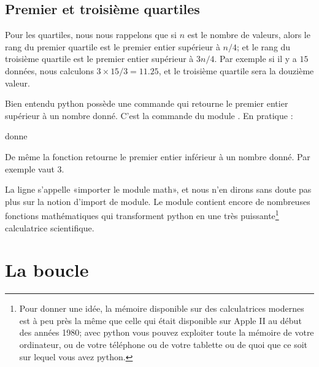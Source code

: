 \subsection{Premier et troisième quartiles}

Pour les quartiles, nous nous rappelons que si \( n\) est le nombre de valeurs, alors le rang du premier quartile est le premier entier supérieur à \( n/4\); et le rang du troisième quartile est le premier entier supérieur à \( 3n/4\). Par exemple si il y a \( 15\) données, nous calculons \( 3\times 15/3= 11.25\), et le troisième quartile sera la douzième valeur.


Bien entendu python possède une commande qui retourne le premier entier supérieur à un nombre donné. C'est la commande  du module . En pratique :



donne 


De même la fonction  retourne le premier entier inférieur à un nombre donné. Par exemple  vaut \( 3\).

La ligne  s'appelle «importer le module math», et nous n'en dirons sans doute pas plus sur la notion d'import de module. Le module  contient encore de nombreuses fonctions mathématiques qui transforment python en une très puissante\footnote{Pour donner une idée, la mémoire disponible sur des calculatrices modernes est à peu près la même que celle qui était disponible sur Apple II au début des années 1980; avec python vous pouvez exploiter toute la mémoire de votre ordinateur, ou de votre téléphone ou de votre tablette ou de quoi que ce soit sur lequel vous avez python.} calculatrice scientifique.




\section{La boucle }

